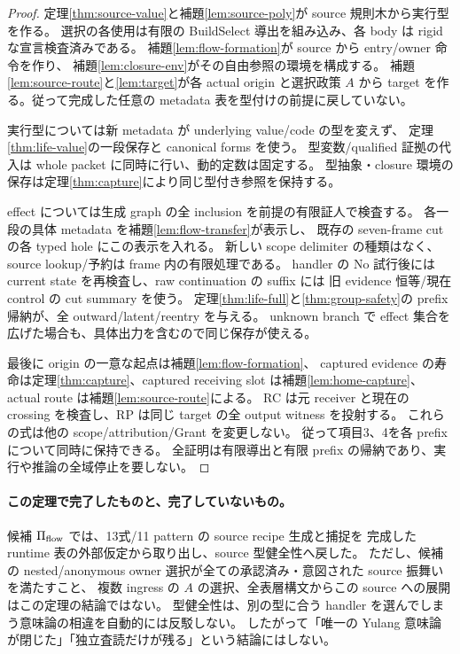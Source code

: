\documentclass[11pt,a4paper]{article}
\begin{document}
\begin{proof}
定理\ref{thm:source-value}と補題\ref{lem:source-poly}が source 規則木から実行型を作る。
選択の各使用は有限の BuildSelect 導出を組み込み、各 body は rigid な宣言検査済みである。
補題\ref{lem:flow-formation}が source から entry/owner 命令を作り、
補題\ref{lem:closure-env}がその自由参照の環境を構成する。
補題\ref{lem:source-route}と\ref{lem:target}が各 actual origin と選択政策 \(A\) から
target を作る。従って完成した任意の metadata 表を型付けの前提に戻していない。

実行型については新 metadata が underlying value/code の型を変えず、
定理\ref{thm:life-value}の一段保存と canonical forms を使う。
型変数/qualified 証拠の代入は whole packet に同時に行い、動的定数は固定する。
型抽象・closure 環境の保存は定理\ref{thm:capture}により同じ型付き参照を保持する。

effect については生成 graph の全 inclusion を前提の有限証人で検査する。
各一段の具体 metadata を補題\ref{lem:flow-transfer}が表示し、
既存の seven-frame cut の各 typed hole にこの表示を入れる。
新しい scope delimiter の種類はなく、source lookup/予約は frame 内の有限処理である。
handler の No 試行後には current state を再検査し、raw continuation の suffix には
旧 evidence 恒等/現在 control の cut summary を使う。
定理\ref{thm:life-full}と\ref{thm:group-safety}の prefix 帰納が、全 outward/latent/reentry を与える。
unknown branch で effect 集合を広げた場合も、具体出力を含むので同じ保存が使える。

最後に origin の一意な起点は補題\ref{lem:flow-formation}、
captured evidence の寿命は定理\ref{thm:capture}、captured receiving slot は補題\ref{lem:home-capture}、
actual route は補題\ref{lem:source-route}による。
RC は元 receiver と現在の crossing を検査し、RP は同じ target の全 output witness を投射する。
これらの式は他の scope/attribution/Grant を変更しない。
従って項目3、4を各 prefix について同時に保持できる。
全証明は有限導出と有限 prefix の帰納であり、実行や推論の全域停止を要しない。
\end{proof}

\paragraph{この定理で完了したものと、完了していないもの。}
候補 \(\Pi_{\rm flow}\) では、13式/11 pattern の source recipe 生成と捕捉を
完成した runtime 表の外部仮定から取り出し、source 型健全性へ戻した。
ただし、候補の nested/anonymous owner 選択が全ての承認済み・意図された source 振舞いを満たすこと、
複数 ingress の \(A\) の選択、全表層構文からこの source への展開はこの定理の結論ではない。
型健全性は、別の型に合う handler を選んでしまう意味論の相違を自動的には反駁しない。
したがって「唯一の Yulang 意味論が閉じた」「独立査読だけが残る」という結論にはしない。
\end{document}
